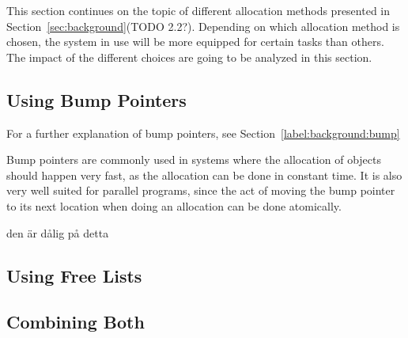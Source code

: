 

This section continues on the topic of different allocation methods presented in Section~\ref{sec:background}(TODO 2.2?). Depending on which allocation method is chosen, the system in use will be more equipped for certain tasks than others. The impact of the different choices are going to be analyzed in this section.

\subsection{Using Bump Pointers}
For a further explanation of bump pointers, see Section~\ref{label:background:bump}

Bump pointers are commonly used in systems where the allocation of objects should happen very fast, as the allocation can be done in constant time. It is also very well suited for parallel programs, since the act of moving the bump pointer to its next location when doing an allocation can be done atomically.



den är dålig på detta

\subsection{Using Free Lists}
\subsection{Combining Both}

